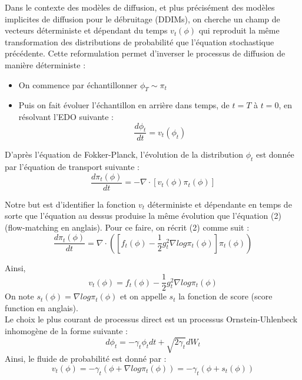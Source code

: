 \documentclass{article}
\theoremstyle{definition} %
\theoremstyle{definition} %
\theoremstyle{definition} %
\theoremstyle{definition} %
\begin{document}
Dans le contexte des modèles de diffusion, et plus précisément des modèles implicites de diffusion pour le débruitage (DDIMs), on cherche un champ de vecteurs déterministe et dépendant du temps $v_t(\phi)$ qui reproduit la même transformation des distributions de probabilité que l'équation stochastique précédente. Cette reformulation permet d'inverser le processus de diffusion de manière déterministe :
\begin{itemize}
    \item On commence par échantillonner $\phi_T \sim \pi_t$
    \item Puis on fait évoluer l'échantillon en arrière dans temps, de $t=T$ à $t = 0$, en résolvant l'EDO suivante :
    \begin{equation}
        \frac{d\phi_t}{dt} = v_t(\phi_t)
    \end{equation}
\end{itemize}

D'après l'équation de Fokker-Planck, l'évolution de la distribution $\phi_t$ est donnée par l'équation de transport suivante :
\[\frac{d\pi_t(\phi)}{dt} =-\nabla \cdot [v_t(\phi)\pi_t(\phi)]\]

Notre but est d'identifier la fonction $v_t$ déterministe et dépendante en temps de sorte que l'équation au dessus produise la même évolution que l'équation (2) (flow-matching en anglais). Pour ce faire, on récrit (2) comme suit :
\[\frac{d\pi_t(\phi)}{dt} =\nabla \cdot([f_t(\phi)-\frac{1}{2}g_t^2\nabla log\pi_t(\phi)]\pi_t(\phi))\]

Ainsi,
\[v_t(\phi) =f_t(\phi)-\frac{1}{2}g_t^2\nabla log\pi_t(\phi) \]
On note $s_t(\phi) = \nabla log\pi_t(\phi)$ et on appelle $s_t$ la fonction de score (score function en anglais).\\

Le choix le plus courant de processus direct est un processus Ornstein-Uhlenbeck inhomogène de la forme suivante :
\[d\phi_t = -\gamma_t\phi_tdt + \sqrt{2\gamma_t}dW_t\]
Ainsi, le fluide de probabilité est donné par :
\[v_t(\phi) = -\gamma_t(\phi+\nabla log \pi_t(\phi)) = -\gamma_t(\phi+s_t(\phi))\]
\end{document}
